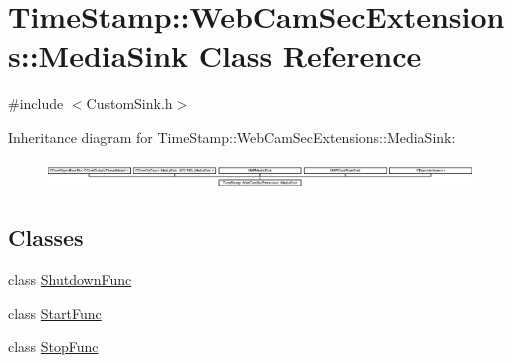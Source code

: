\hypertarget{class_time_stamp_1_1_web_cam_sec_extensions_1_1_media_sink}{}\section{Time\+Stamp\+:\+:Web\+Cam\+Sec\+Extensions\+:\+:Media\+Sink Class Reference}
\label{class_time_stamp_1_1_web_cam_sec_extensions_1_1_media_sink}


{\ttfamily \#include $<$Custom\+Sink.\+h$>$}

Inheritance diagram for Time\+Stamp\+:\+:Web\+Cam\+Sec\+Extensions\+:\+:Media\+Sink\+:\begin{figure}[H]
\begin{center}
\leavevmode
\includegraphics[height=0.734426cm]{da/dfa/class_time_stamp_1_1_web_cam_sec_extensions_1_1_media_sink}
\end{center}
\end{figure}
\subsection*{Classes}
\begin{DoxyCompactItemize}
\item 
class \hyperlink{class_time_stamp_1_1_web_cam_sec_extensions_1_1_media_sink_1_1_shutdown_func}{Shutdown\+Func}
\item 
class \hyperlink{class_time_stamp_1_1_web_cam_sec_extensions_1_1_media_sink_1_1_start_func}{Start\+Func}
\item 
class \hyperlink{class_time_stamp_1_1_web_cam_sec_extensions_1_1_media_sink_1_1_stop_func}{Stop\+Func}
\end{DoxyCompactItemize}
